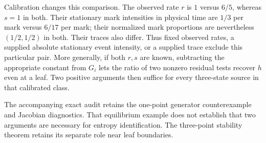 Calibration changes this comparison. The observed rate $r$ is $1$ versus
$6/5$, whereas $s=1$ in both. Their stationary mark intensities in physical
time are $1/3$ per mark versus $6/17$ per mark; their normalized mark
proportions are nevertheless $(1/2,1/2)$ in both. Their traces also differ.
Thus fixed observed rates, a supplied absolute stationary event intensity,
or a supplied trace exclude this particular pair. More generally, if both
$r,s$ are known, subtracting the appropriate constant from $G_i$ lets the
ratio of two nonzero residual tests recover $h$ even at a leaf. Two positive
arguments then suffice for every three-state source in that calibrated class.

The accompanying exact audit retains the one-point generator counterexample
and Jacobian diagnostics. That equilibrium example does not establish that
two arguments are necessary for entropy identification. The three-point
stability theorem retains its separate role near leaf boundaries.
